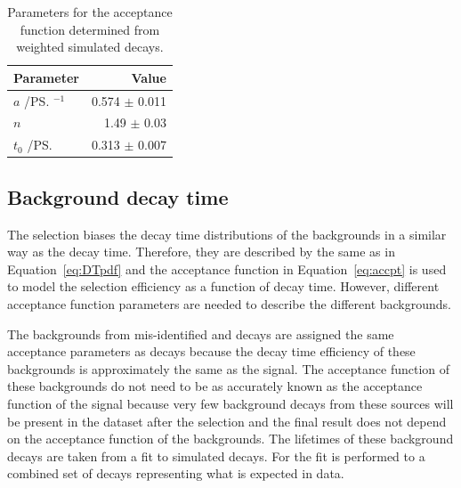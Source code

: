 \begin{table}[tbp]
\begin{center}
\begin{tabular}{lr}
\toprule \toprule
Parameter & Value \\
\midrule
$a$ /\ps$^{-1}$ & 0.574 $\pm$ 0.011\\
$n$ & 1.49 $\pm$ 0.03 \\
$t_{0}$ /\ps &  0.313 $\pm$ 0.007 \\

\bottomrule \bottomrule
\end{tabular}
\vspace{0.7cm}             
\caption{Parameters for the \bsmumu acceptance function determined from weighted simulated \bsmumu decays.}
\label{tab:accptsig}
\end{center}
\vspace{-1.0cm}                                                                                                                                               
\end{table}

\subsection{Background decay time \pdfs}
\label{sec:bkgDTpdf}



The selection biases the decay time distributions of the backgrounds in a similar way as the \bsmumu decay time. Therefore, they are described by the same \pdf as in Equation~\ref{eq:DTpdf} and the acceptance function in Equation~\ref{eq:accpt} is used to model the selection efficiency as a function of decay time. However, different acceptance function parameters are needed to describe the different backgrounds. 

The backgrounds from mis-identified and \bdmumu decays are assigned the same acceptance parameters as \bsmumu decays because the decay time efficiency of these backgrounds is approximately the same as the signal. The acceptance function of these backgrounds do not need to be as accurately known as the acceptance function of the signal because very few background decays from these sources will be present in the dataset after the selection and the final result does not depend on the acceptance function of the backgrounds. The lifetimes of these background decays are taken from a fit to simulated decays. For \bhh the fit is performed to a combined set of \bhh decays representing what is expected in data. %

